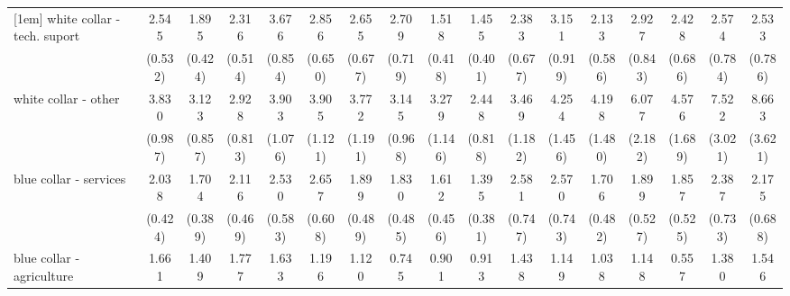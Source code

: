 {\begin{tabular}{l*{16}{c}}
[1em]
white collar - tech. suport&       2.545\sym{***}&       1.895\sym{**} &       2.316\sym{***}&       3.676\sym{***}&       2.856\sym{***}&       2.655\sym{***}&       2.709\sym{***}&       1.518         &       1.455         &       2.383\sym{**} &       3.151\sym{***}&       2.133\sym{**} &       2.927\sym{***}&       2.428\sym{**} &       2.574\sym{**} &       2.533\sym{**} \\
                    &     (0.532)         &     (0.424)         &     (0.514)         &     (0.854)         &     (0.650)         &     (0.677)         &     (0.719)         &     (0.418)         &     (0.401)         &     (0.677)         &     (0.919)         &     (0.586)         &     (0.843)         &     (0.686)         &     (0.784)         &     (0.786)         \\
[1em]
white collar - other&       3.830\sym{***}&       3.123\sym{***}&       2.928\sym{***}&       3.903\sym{***}&       3.905\sym{***}&       3.772\sym{***}&       3.145\sym{***}&       3.279\sym{***}&       2.448\sym{**} &       3.469\sym{***}&       4.254\sym{***}&       4.198\sym{***}&       6.077\sym{***}&       4.576\sym{***}&       7.522\sym{***}&       8.663\sym{***}\\
                    &     (0.987)         &     (0.857)         &     (0.813)         &     (1.076)         &     (1.121)         &     (1.191)         &     (0.968)         &     (1.146)         &     (0.818)         &     (1.182)         &     (1.456)         &     (1.480)         &     (2.182)         &     (1.689)         &     (3.021)         &     (3.621)         \\
[1em]
blue collar - services&       2.038\sym{***}&       1.704\sym{*}  &       2.116\sym{***}&       2.530\sym{***}&       2.657\sym{***}&       1.899\sym{*}  &       1.830\sym{*}  &       1.612         &       1.395         &       2.581\sym{**} &       2.570\sym{**} &       1.706         &       1.899\sym{*}  &       1.857\sym{*}  &       2.387\sym{**} &       2.175\sym{*}  \\
                    &     (0.424)         &     (0.389)         &     (0.469)         &     (0.583)         &     (0.608)         &     (0.489)         &     (0.485)         &     (0.456)         &     (0.381)         &     (0.747)         &     (0.743)         &     (0.482)         &     (0.527)         &     (0.525)         &     (0.733)         &     (0.688)         \\
[1em]
blue collar - agriculture&       1.661         &       1.409         &       1.777         &       1.633         &       1.196         &       1.120         &       0.745         &       0.901         &       0.913         &       1.438         &       1.149         &       1.038         &       1.148         &       0.557         &       1.380         &       1.546         \\

\end{tabular}}
